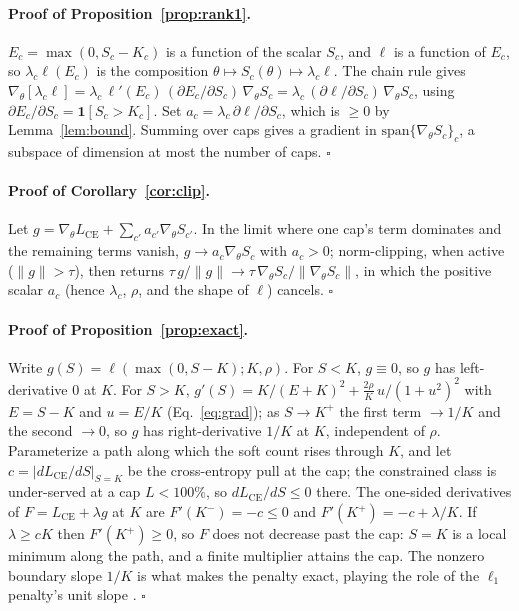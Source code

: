 \documentclass[letterpaper]{article}
\begin{document}
\paragraph{Proof of Proposition~\ref{prop:rank1}.}
$E_c=\max(0,S_c-K_c)$ is a function of the scalar $S_c$, and $\ell$ is a function of $E_c$,
so $\lambda_c\ell(E_c)$ is the composition $\theta\mapsto S_c(\theta)\mapsto\lambda_c\ell$.
The chain rule gives $\nabla_\theta[\lambda_c\ell]=\lambda_c\,\ell'(E_c)\,(\partial
E_c/\partial S_c)\,\nabla_\theta S_c=\lambda_c\,(\partial\ell/\partial S_c)\,\nabla_\theta
S_c$, using $\partial E_c/\partial S_c=\mathbf 1[S_c>K_c]$. Set $a_c=\lambda_c\,
\partial\ell/\partial S_c$, which is $\ge 0$ by Lemma~\ref{lem:bound}. Summing over caps
gives a gradient in $\mathrm{span}\{\nabla_\theta S_c\}_c$, a subspace of dimension at most
the number of caps. $\square$

\paragraph{Proof of Corollary~\ref{cor:clip}.}
Let $g=\nabla_\theta L_{\text{CE}}+\sum_{c'}a_{c'}\nabla_\theta S_{c'}$. In the limit where one
cap's term dominates and the remaining terms vanish, $g\to a_c\nabla_\theta S_c$ with $a_c>0$;
norm-clipping, when active ($\lVert g\rVert>\tau$), then returns $\tau\,g/\lVert
g\rVert\to\tau\,\nabla_\theta S_c/\lVert\nabla_\theta S_c\rVert$, in which the positive scalar
$a_c$ (hence $\lambda_c$, $\rho$, and the shape of $\ell$) cancels. $\square$

\paragraph{Proof of Proposition~\ref{prop:exact}.}
Write $g(S)=\ell(\max(0,S{-}K);K,\rho)$. For $S<K$, $g\equiv0$, so $g$ has left-derivative
$0$ at $K$. For $S>K$, $g'(S)=K/(E+K)^2+\tfrac{2\rho}{K}\,u/(1+u^2)^2$ with $E=S-K$ and
$u=E/K$ (Eq.~\eqref{eq:grad}); as $S\to K^+$ the first term $\to1/K$ and the second $\to0$, so
$g$ has right-derivative $1/K$ at $K$, independent of $\rho$. Parameterize a path along which
the soft count rises through $K$, and let $c=\lvert dL_{\text{CE}}/dS\rvert_{S=K}$ be the
cross-entropy pull at the cap; the constrained class is under-served at a cap $L<100\%$, so
$dL_{\text{CE}}/dS\le0$ there. The one-sided derivatives of $F=L_{\text{CE}}+\lambda g$ at $K$
are $F'(K^-)=-c\le0$ and $F'(K^+)=-c+\lambda/K$. If $\lambda\ge cK$ then $F'(K^+)\ge0$, so $F$
does not decrease past the cap: $S{=}K$ is a local minimum along the path, and a finite
multiplier attains the cap. The nonzero boundary slope $1/K$ is what makes the penalty exact,
playing the role of the $\ell_1$ penalty's unit slope \citep{nocedal2006numerical}. $\square$
\end{document}
